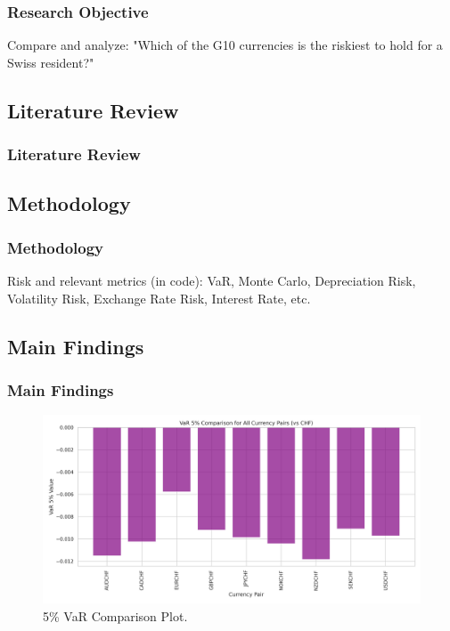 \documentclass[10pt]{beamer}
\begin{document}
\begin{frame}
\frametitle{Research Objective}
Compare and analyze: "Which of the G10 currencies is the riskiest to hold for a Swiss resident?"
\end{frame}
\begin{frame}
\section{Literature Review}
\frametitle{Literature Review}

\end{frame}
\begin{frame}
\section{Methodology}
\frametitle{Methodology}
Risk and relevant metrics (in code): VaR, Monte Carlo, Depreciation Risk, Volatility Risk, Exchange Rate Risk, Interest Rate, etc.
\end{frame}
\begin{frame}
\section{Main Findings}
\frametitle{Main Findings}
\begin{figure}
    \centering
    \includegraphics[width=0.5\linewidth]{reports/figures/var_5_percent_comparison_plot.png}
    \caption{5\% VaR Comparison Plot.}
    \label{fig:var_5_percent_comparison_plot}
\end{figure}
\end{frame}
\end{document}

